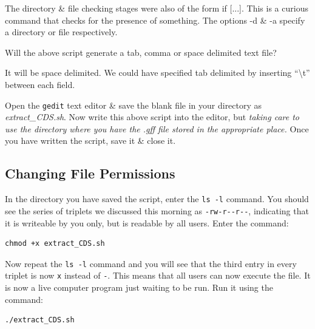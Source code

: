 \documentclass[a4paper,12pt,twoside]{memoir}
\begin{document}
\begin{information}
The directory \& file checking stages were also of the form if [...].
This is a curious command that checks for the presence of something. 
The options -d \& -a specify a directory or file respectively.
\end{information}

\begin{questions}
Will the above script generate a tab, comma or space delimited text file? \\
\begin{answer}
It will be space delimited. 
We could have specified tab delimited by inserting ``\textbackslash t'' between each field.
\end{answer}
\end{questions}

\begin{steps}
Open the \texttt{gedit} text editor \& save the blank file in your directory as \textit{extract_CDS.sh}.
Now write this above script into the editor, but \textit{taking care to use the directory where you have the .gff file stored in the appropriate place.}
Once you have written the script, save it \& close it.\\
\end{steps}

\subsection{Changing File Permissions}
\begin{steps}
In the directory you have saved the script, enter the \texttt{ls -l} command.
You should see the series of triplets we discussed this morning as \texttt{-rw-r-{}-r-{}-}, indicating that it is writeable by you only, but is readable by all users.
Enter the command: \\
\begin{lstlisting}
chmod +x extract_CDS.sh
\end{lstlisting}
Now repeat the \texttt{ls -l} command and you will see that the third entry in every triplet is now \texttt{x} instead of \texttt{-}.
This means that all users can now execute the file.
It is now a live computer program just waiting to be run.
Run it using the command: \\
\begin{lstlisting}
./extract_CDS.sh
\end{lstlisting}
\end{steps}
\end{document}
